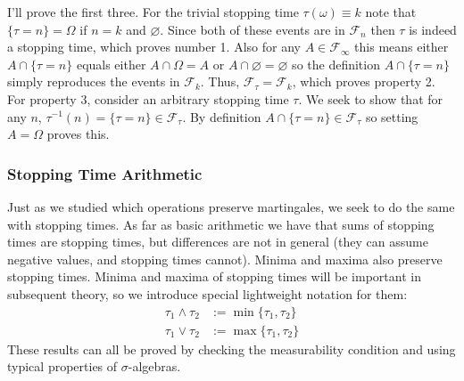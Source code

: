 \documentclass[12pt]{article}
\begin{document}
I'll prove the first three. For the trivial stopping time $\tau(\omega) \equiv k$ note that $\{\tau = n\} = \Omega$ if $n = k$ and $\varnothing$. Since both of these events are in $\mathcal{F}_n$
then $\tau$ is indeed a stopping time, which proves number 1. Also for any $A \in \mathcal{F}_\infty$ this means either $A \cap \{\tau = n\}$ equals either $A \cap \Omega = A$ or 
$A \cap \varnothing = \varnothing$ so the definition $A \cap \{\tau = n\}$ simply reproduces the events in $\mathcal{F}_k$. Thus, $\mathcal{F}_\tau = \mathcal{F}_k$, which proves property 2. 
For property 3, consider an arbitrary stopping time $\tau$. We seek to show that for any $n$, $\tau^{-1}(n) = \{\tau = n\} \in \mathcal{F}_\tau$. By definition 
$A \cap \{\tau = n\} \in \mathcal{F}_\tau$ so setting $A = \Omega$ proves this. 

\subsubsection{Stopping Time Arithmetic}
Just as we studied which operations preserve martingales, we seek to do the same with stopping times. As far as basic arithmetic we have that 
sums of stopping times are stopping times, but differences are not in general (they can assume negative values, and stopping times cannot). Minima and maxima also 
preserve stopping times. Minima and maxima of stopping times will be important in subsequent theory, so we introduce special lightweight notation for them:
\begin{align*}
\tau_1 \wedge \tau_2 &:= \min\{\tau_1, \tau_2\} \\
\tau_1 \vee \tau_2 &:= \max\{\tau_1, \tau_2\}
\end{align*}
These results can all be proved by checking the measurability condition and using typical properties of $\sigma$-algebras. 
\end{document}
